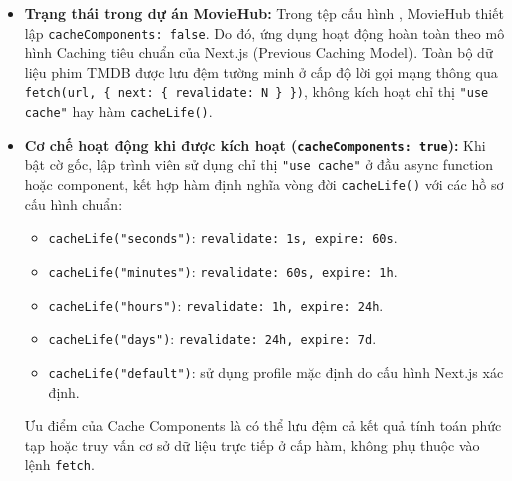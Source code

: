 \documentclass[12pt,a4paper]{extarticle}
\begin{document}
\begin{itemize}[noitemsep]
    \item \textbf{Trạng thái trong dự án MovieHub:} Trong tệp cấu hình , MovieHub thiết lập \texttt{cacheComponents: false}. Do đó, ứng dụng hoạt động hoàn toàn theo mô hình Caching tiêu chuẩn của Next.js (Previous Caching Model). Toàn bộ dữ liệu phim TMDB được lưu đệm tường minh ở cấp độ lời gọi mạng thông qua \texttt{fetch(url, \{ next: \{ revalidate: N \} \})}, không kích hoạt chỉ thị \texttt{"use cache"} hay hàm \texttt{cacheLife()}.
    \item \textbf{Cơ chế hoạt động khi được kích hoạt (\texttt{cacheComponents: true}):} Khi bật cờ gốc, lập trình viên sử dụng chỉ thị \texttt{"use cache"} ở đầu async function hoặc component, kết hợp hàm định nghĩa vòng đời \texttt{cacheLife()} với các hồ sơ cấu hình chuẩn:
    \begin{itemize}[noitemsep]
        \item \texttt{cacheLife("seconds")}: \texttt{revalidate: 1s, expire: 60s}.
        \item \texttt{cacheLife("minutes")}: \texttt{revalidate: 60s, expire: 1h}.
        \item \texttt{cacheLife("hours")}: \texttt{revalidate: 1h, expire: 24h}.
        \item \texttt{cacheLife("days")}: \texttt{revalidate: 24h, expire: 7d}.
        \item \texttt{cacheLife("default")}: sử dụng profile mặc định do cấu hình Next.js xác định.
    \end{itemize}
    Ưu điểm của Cache Components là có thể lưu đệm cả kết quả tính toán phức tạp hoặc truy vấn cơ sở dữ liệu trực tiếp ở cấp hàm, không phụ thuộc vào lệnh \texttt{fetch}.
\end{itemize}
\end{document}
